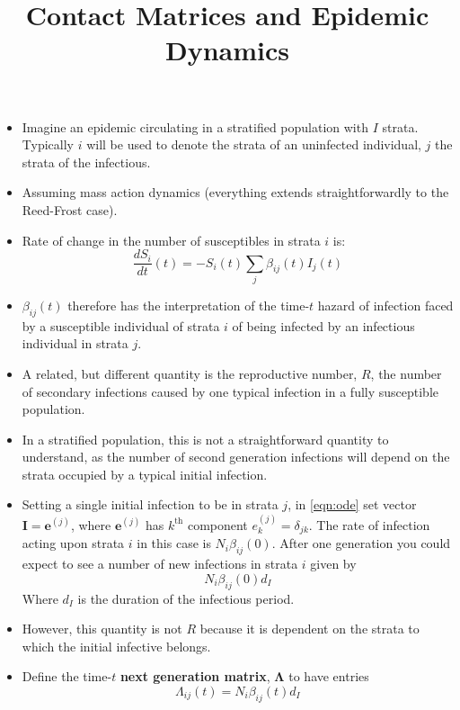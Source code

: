 \documentclass{article}
\title{Contact Matrices and Epidemic Dynamics}
\renewcommand{\vec}[1]{\boldsymbol{{#1}}}
\begin{document}
\maketitle
\begin{itemize}
\item Imagine an epidemic circulating in a stratified population with $I$ strata. Typically $i$ will be used to denote the strata of an uninfected individual, $j$ the strata of the infectious.
  
\item Assuming mass action dynamics (everything extends straightforwardly to the Reed-Frost case).
  
\item Rate of change in the number of susceptibles in strata $i$ is:
  \begin{equation}\label{eqn:ode}
    \frac{dS_i}{dt}(t) = -S_i(t) \sum_j \beta_{ij}(t) I_j(t) 
  \end{equation}
  
\item $\beta_{ij}(t)$ therefore has the interpretation of the time-$t$ hazard of infection faced by a susceptible individual of strata $i$ of being infected by an infectious individual in strata $j$.
  
\item A related, but different quantity is the reproductive number, $R$, the number of secondary infections caused by one typical infection in a fully susceptible population.
  
\item In a stratified population, this is not a straightforward quantity to understand, as the number of second generation infections will depend on the strata occupied by a typical initial infection.
  
\item Setting a single initial infection to be in strata $j$, in \eqref{eqn:ode} set vector $\vec{I} = \vec{e}^{(j)}$, where $\vec{e}^{(j)}$ has $k^{\textrm{th}}$ component $e^{(j)}_k = \delta_{jk}$. The rate of infection acting upon strata $i$ in this case is $N_i\beta_{ij}(0)$. After one generation you could expect to see a number of new infections in strata $i$ given by
  \begin{equation*}
    N_i\beta_{ij}(0)d_I
  \end{equation*}
  Where $d_I$ is the duration of the infectious period.

\item However, this quantity is not $R$ because it is dependent on the strata to which the initial infective belongs.
\item Define the time-$t$ {\bf next generation matrix}, $\vec{\Lambda}$ to have entries
  \begin{equation}\label{eqn:ngm}
    \Lambda_{ij}(t) = N_i\beta_{ij}(t)d_I
  \end{equation}


\end{itemize}
\end{document}
